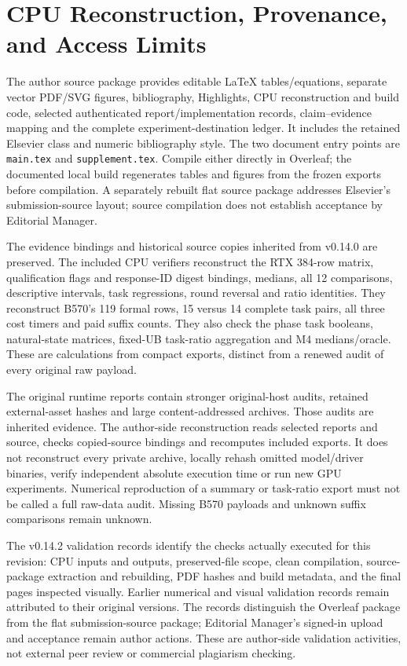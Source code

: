 \section{CPU Reconstruction, Provenance, and Access Limits}
\label{supp:reproducibility}
The author source package provides editable LaTeX tables/equations, separate vector PDF/SVG figures, bibliography, Highlights, CPU reconstruction and build code, selected authenticated report/implementation records, claim--evidence mapping and the complete experiment-destination ledger. It includes the retained Elsevier class and numeric bibliography style. The two document entry points are \texttt{main.tex} and \texttt{supplement.tex}. Compile either directly in Overleaf; the documented local build regenerates tables and figures from the frozen exports before compilation. A separately rebuilt flat source package addresses Elsevier's submission-source layout; source compilation does not establish acceptance by Editorial Manager.

The evidence bindings and historical source copies inherited from v0.14.0 are preserved. The included CPU verifiers reconstruct the RTX 384-row matrix, qualification flags and response-ID digest bindings, medians, all 12 comparisons, descriptive intervals, task regressions, round reversal and ratio identities. They reconstruct B570's 119 formal rows, 15 versus 14 complete task pairs, all three cost timers and paid suffix counts. They also check the phase task booleans, natural-state matrices, fixed-UB task-ratio aggregation and M4 medians/oracle. These are calculations from compact exports, distinct from a renewed audit of every original raw payload.

The original runtime reports contain stronger original-host audits, retained external-asset hashes and large content-addressed archives. Those audits are inherited evidence. The author-side reconstruction reads selected reports and source, checks copied-source bindings and recomputes included exports. It does not reconstruct every private archive, locally rehash omitted model/driver binaries, verify independent absolute execution time or run new GPU experiments. Numerical reproduction of a summary or task-ratio export must not be called a full raw-data audit. Missing B570 payloads and unknown suffix comparisons remain unknown.

The v0.14.2 validation records identify the checks actually executed for this revision: CPU inputs and outputs, preserved-file scope, clean compilation, source-package extraction and rebuilding, PDF hashes and build metadata, and the final pages inspected visually. Earlier numerical and visual validation records remain attributed to their original versions. The records distinguish the Overleaf package from the flat submission-source package; Editorial Manager's signed-in upload and acceptance remain author actions. These are author-side validation activities, not external peer review or commercial plagiarism checking.

